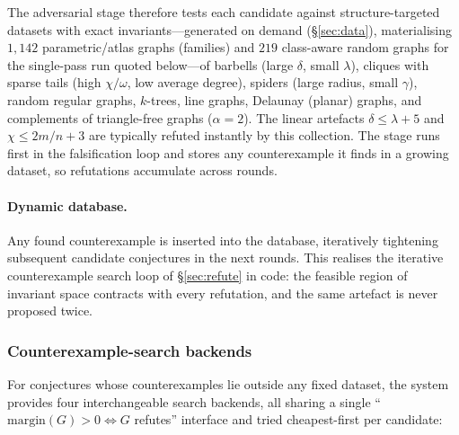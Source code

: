 \documentclass[]{ceurart}
\begin{document}
The adversarial stage therefore tests each candidate against structure-targeted datasets with exact
invariants---generated on demand (\S\ref{sec:data}), materialising $1{,}142$ parametric/atlas graphs
(families) and $219$ class-aware random graphs for the single-pass run quoted below---of
barbells (large $\delta$, small $\lambda$), cliques with sparse tails (high
$\chi/\omega$, low average degree), spiders (large radius, small $\gamma$),
random regular graphs, $k$-trees, line graphs, Delaunay (planar) graphs, and
complements of triangle-free graphs ($\alpha=2$). The linear
artefacts $\delta\le\lambda+5$ and $\chi\le 2m/n+3$ are typically refuted instantly by this collection. The
stage runs first in the falsification loop and stores any counterexample it
finds in a growing dataset, so refutations accumulate across rounds.



\paragraph{Dynamic database.} Any found counterexample is inserted into the database, iteratively
tightening subsequent candidate conjectures in the next rounds. This realises the iterative counterexample search loop of
\S\ref{sec:refute} in code: the feasible region of invariant space
contracts with every refutation, and the same artefact is never proposed twice.

\subsubsection{Counterexample-search backends}
\label{sec:backends}
For conjectures whose counterexamples lie outside any fixed dataset, the system
provides four interchangeable search backends, all sharing a single
``$\mathrm{margin}(G)>0\iff G$ refutes'' interface and tried cheapest-first per
candidate:
\end{document}
